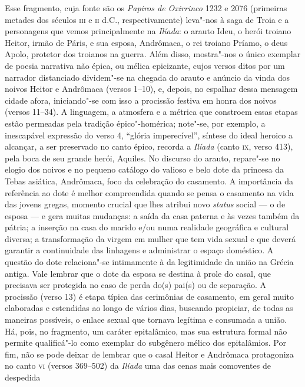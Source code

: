 {\small Esse fragmento, cuja fonte são os \textit{Papiros de Oxirrinco} 1232 e 2076
(primeiras metades dos séculos \textsc{iii} e \textsc{ii} d.C., respectivamente) leva"-nos à saga
de Troia e a personagens que vemos principalmente na \textit{Ilíada}: o arauto
Ideu, o herói troiano Heitor, irmão de Páris, e sua esposa, Andrômaca, o rei
troiano Príamo, o deus Apolo, protetor dos troianos na guerra. Além disso,
mostra"-nos o único exemplar de poesia narrativa não épica, ou mélica
epicizante, cujos versos ditos por um narrador distanciado dividem"-se na
chegada do arauto e anúncio da vinda dos noivos Heitor e Andrômaca (versos
1--10), e, depois, no espalhar dessa mensagem cidade afora, iniciando"-se com
isso a procissão festiva em honra dos noivos (versos 11--34). A linguagem, a
atmosfera e a métrica que constroem essas etapas estão permeadas pela tradição
épico"-homérica; note"-se, por exemplo, a inescapável expressão do verso 4,
``glória imperecível”, síntese do ideal heroico a alcançar, a
ser preservado no canto épico, recorda a \textit{Ilíada }(canto \textsc{ix}, verso 413),
pela boca de seu grande herói, Aquiles. No discurso do arauto, repare"-se no
elogio dos noivos e no pequeno catálogo do valioso e belo dote da princesa da
Tebas asiática, Andrômaca, foco da celebração do casamento. A importância da
referência ao dote é melhor
compreendida quando se pensa o casamento na vida das jovens gregas, momento
crucial que lhes atribui novo \textit{status} social --- o de esposa --- e gera
muitas mudanças: a saída da casa paterna e às vezes também da pátria; a
inserção na casa do marido e/ou numa realidade geográfica e cultural diversa; a
transformação da virgem em mulher que tem vida sexual e que deverá garantir a
continuidade das linhagens e administrar o espaço doméstico. A questão do dote
relaciona"-se intimamente à da legitimidade da união na Grécia antiga. Vale
lembrar que o dote da esposa se destina à prole do casal, que precisava ser
protegida no caso de perda do(s) pai(s) ou de separação. A procissão (verso
13) é etapa típica das cerimônias de casamento, em geral muito elaboradas e
estendidas ao longo de vários dias, buscando propiciar, de todas as maneiras
possíveis, o enlace sexual que tornava legítima e consumada a união. Há, pois,
no fragmento, um caráter epitalâmico, mas sua estrutura formal não permite
qualificá"-lo como exemplar do subgênero mélico dos epitalâmios. Por fim, não se
pode deixar de lembrar que o casal Heitor e Andrômaca protagoniza no canto \textsc{vi}
(versos 369--502) da \textit{Ilíada }uma das cenas mais comoventes de despedida
}
